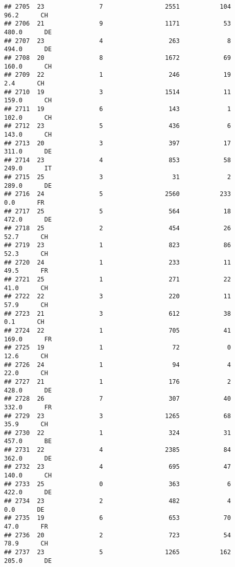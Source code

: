 \documentclass[
]{article}
\begin{document}
\begin{verbatim}
## 2705  23               7                 2551           104     96.2      CH
## 2706  21               9                 1171            53    480.0      DE
## 2707  23               4                  263             8    494.0      DE
## 2708  20               8                 1672            69    160.0      CH
## 2709  22               1                  246            19      2.4      CH
## 2710  19               3                 1514            11    159.0      CH
## 2711  19               6                  143             1    102.0      CH
## 2712  23               5                  436             6    143.0      CH
## 2713  20               3                  397            17    311.0      DE
## 2714  23               4                  853            58    249.0      IT
## 2715  25               3                   31             2    289.0      DE
## 2716  24               5                 2560           233      0.0      FR
## 2717  25               5                  564            18    472.0      DE
## 2718  25               2                  454            26     52.7      CH
## 2719  23               1                  823            86     52.3      CH
## 2720  24               1                  233            11     49.5      FR
## 2721  25               1                  271            22     41.0      CH
## 2722  22               3                  220            11     57.9      CH
## 2723  21               3                  612            38      0.1      CH
## 2724  22               1                  705            41    169.0      FR
## 2725  19               1                   72             0     12.6      CH
## 2726  24               1                   94             4     22.0      CH
## 2727  21               1                  176             2    428.0      DE
## 2728  26               7                  307            40    332.0      FR
## 2729  23               3                 1265            68     35.9      CH
## 2730  22               1                  324            31    457.0      BE
## 2731  22               4                 2385            84    362.0      DE
## 2732  23               4                  695            47    140.0      CH
## 2733  25               0                  363             6    422.0      DE
## 2734  23               2                  482             4      0.0      DE
## 2735  19               6                  653            70     47.0      FR
## 2736  20               2                  723            54     78.9      CH
## 2737  23               5                 1265           162    205.0      DE

\end{verbatim}
\end{document}
